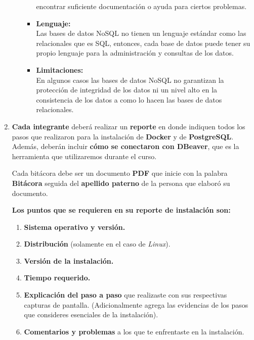 \documentclass[12pt]{report}
\begin{document}
\begin{enumerate}[label=\roman*.]
\begin{enumerate}[label=\textbf{\arabic*.}, itemsep=2.0em]
\begin{itemize}
      encontrar suficiente documentación o ayuda para ciertos problemas.
      \item \textbf{Lenguaje:\\} 
      Las bases de datos NoSQL no tienen un lenguaje estándar como las relacionales que es SQL, entonces, cada base de datos puede tener su 
      propio lenguaje para la administración y consultas de los datos.
      \item \textbf{Limitaciones:\\} 
      En algunos casos las bases de datos NoSQL no garantizan la protección de integridad de los datos ni un nivel alto en la consistencia 
      de los datos a como lo hacen las bases de datos relacionales.
  \end{itemize}
\end{enumerate}

\bigskip




\item \textbf{Cada integrante} deberá realizar un \textbf{reporte} en donde indiquen todos los pasos que realizaron para la instalación de \textbf{Docker} y de \textbf{PostgreSQL}. Además, deberán incluir \textbf{cómo se conectaron con DBeaver}, que es la herramienta que utilizaremos durante el curso. 

Cada bitácora debe ser un documento \textbf{PDF} que inicie con la palabra \textbf{Bitácora} seguida del \textbf{apellido paterno} de la persona que elaboró su documento.

\medskip

\textbf{Los puntos que se requieren en su reporte de instalación son:}

\begin{enumerate}[label=\textbf{\arabic*.}, leftmargin=*, itemsep=0.8em]
  \item \textbf{Sistema operativo y versión.}
  \item \textbf{Distribución} (solamente en el caso de \textit{Linux}).
  \item \textbf{Versión de la instalación.}
  \item \textbf{Tiempo requerido.}
  \item \textbf{Explicación del paso a paso} que realizaste con sus respectivas capturas de pantalla. (Adicionalmente agrega las evidencias de los pasos que consideres esenciales de la instalación).
  \item \textbf{Comentarios y problemas} a los que te enfrentaste en la instalación.
\end{enumerate}

\end{enumerate}
\end{document}
